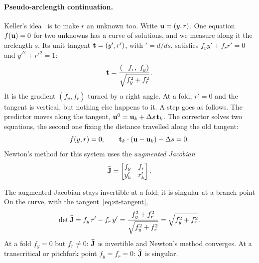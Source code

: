 \paragraph{Pseudo-arclength continuation.}
%
Keller's idea~\cite{st-keller1977} is to make $r$ an unknown too. Write
$\mathbf{u} = (y,r)$. One equation $f(\mathbf{u}) = 0$ for two unknowns has a curve of
solutions, and we measure along it the arclength $s$. Its unit tangent
$\mathbf{t} = (y',r')$, with $' = d/ds$, satisfies $f_y y' + f_r r' = 0$ and
$y'^2 + r'^2 = 1$:
\begin{equation}\label{eq:st-tangent}
  \mathbf{t} = \frac{(-f_r,\; f_y)}{\sqrt{f_y^2 + f_r^2}} .
\end{equation}
It is the gradient $(f_y,f_r)$ turned by a right angle. At a fold, $r' = 0$ and the
tangent is vertical, but nothing else happens to it. A step goes as follows. The
predictor moves along the tangent, $\mathbf{u}^0 = \mathbf{u}_k + \Delta s\,\mathbf{t}_k$. The
corrector solves two equations, the second one fixing the distance travelled along
the old tangent:
\begin{equation}\label{eq:st-augmented}
  f(y,r) = 0, \qquad \mathbf{t}_k \cdot (\mathbf{u} - \mathbf{u}_k) - \Delta s = 0 .
\end{equation}
Newton's method for this system uses the \emph{augmented Jacobian}
%
\begin{equation}\label{eq:st-jhat}
  \widehat{\mathbf{J}} = \begin{bmatrix} f_y & f_r \\ y'_k & r'_k \end{bmatrix}.
\end{equation}

\begin{gbox}{The augmented Jacobian stays invertible at a fold; it is singular at a branch point}\label{sec:st-augmented}
%
On the curve, with the tangent~\eqref{eq:st-tangent},
\begin{equation}\label{eq:st-detjhat}
  \det\widehat{\mathbf{J}} = f_y\,r' - f_r\,y'
  = \frac{f_y^2 + f_r^2}{\sqrt{f_y^2 + f_r^2}} = \sqrt{f_y^2 + f_r^2} .
\end{equation}
At a fold $f_y = 0$ but $f_r \neq 0$: $\widehat{\mathbf{J}}$ is invertible and Newton's
method converges. At a transcritical or pitchfork point $f_y = f_r = 0$:
$\widehat{\mathbf{J}}$ is singular.
\end{gbox}

